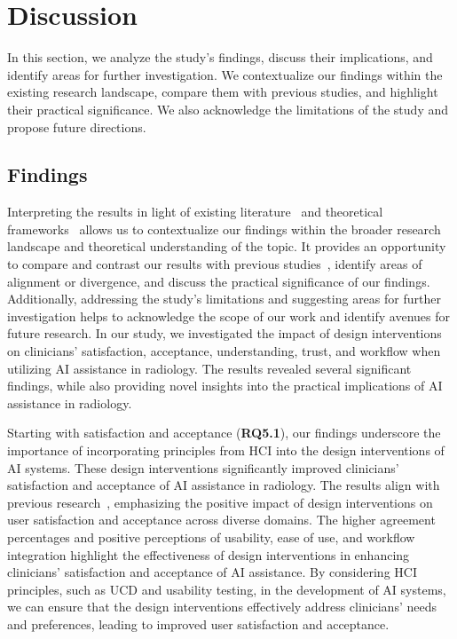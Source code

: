 \section{Discussion}
\label{sec:chap005007}

In this section, we analyze the study's findings, discuss their implications, and identify areas for further investigation.
We contextualize our findings within the existing research landscape, compare them with previous studies, and highlight their practical significance.
We also acknowledge the limitations of the study and propose future directions.

\subsection{Findings}
\label{sec:chap005007001}

Interpreting the results in light of existing literature~\cite{10.1145/3411764.3445432} and theoretical frameworks~\cite{LANDRO2020102897, 10.1145/3311957.3361858} allows us to contextualize our findings within the broader research landscape and theoretical understanding of the topic.
It provides an opportunity to compare and contrast our results with previous studies~\cite{CALISTO2022102285, CALISTO2021102607}, identify areas of alignment or divergence, and discuss the practical significance of our findings.
Additionally, addressing the study's limitations and suggesting areas for further investigation helps to acknowledge the scope of our work and identify avenues for future research.
In our study, we investigated the impact of design interventions on clinicians' satisfaction, acceptance, understanding, trust, and workflow when utilizing \ac{AI} assistance in radiology.
The results revealed several significant findings, while also providing novel insights into the practical implications of \ac{AI} assistance in radiology.

Starting with satisfaction and acceptance ({\bf RQ5.1}), our findings underscore the importance of incorporating principles from \ac{HCI} into the design interventions of \ac{AI} systems.
These design interventions significantly improved clinicians' satisfaction and acceptance of \ac{AI} assistance in radiology.
The results align with previous research~\cite{10.1145/3411764.3445432}, emphasizing the positive impact of design interventions on user satisfaction and acceptance across diverse domains.
The higher agreement percentages and positive perceptions of usability, ease of use, and workflow integration highlight the effectiveness of design interventions in enhancing clinicians' satisfaction and acceptance of \ac{AI} assistance.
By considering \ac{HCI} principles, such as \ac{UCD} and usability testing, in the development of \ac{AI} systems, we can ensure that the design interventions effectively address clinicians' needs and preferences, leading to improved user satisfaction and acceptance.

